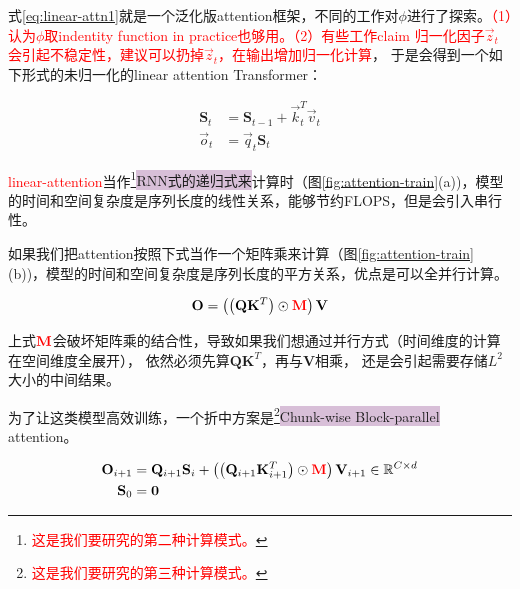 式\eqref{eq:linear-attn1}就是一个泛化版attention框架，不同的工作对$\phi$进行了探索。\textcolor{red}{（1）认为$\phi$取indentity function in practice也够用。（2）有些工作claim 归一化因子$\vec{z}_t$会引起不稳定性，建议可以扔掉$\vec{z}_t$，在输出增加归一化计算}，
于是会得到一个如下形式的未归一化的linear attention Transformer：

\begin{align}
\mathbf{S}_t &= \mathbf{S}_{t-1} + \vec{k}_t^T\vec{v}_t \label{eq:linear-attn2}\\
\vec{o}_t &= \vec{q}_t\mathbf{S}_t \nonumber
\end{align}

\textcolor{red}{linear-attention}当作\footnote{\textcolor{red}{这是我们要研究的第二种计算模式。}}{\colorbox{thistle}{RNN式的递归式来}}计算时（图\ref{fig:attention-train}(a))，模型的时间和空间复杂度是序列长度的线性关系，能够节约FLOPS，但是会引入串行性。

如果我们把attention按照下式当作一个矩阵乘来计算（图\ref{fig:attention-train}(b))，模型的时间和空间复杂度是序列长度的平方关系，优点是可以全并行计算。

$$\mathbf{O} = \left( \left(\mathbf{Q}\mathbf{K}^T\right) \odot \textcolor{red}{\mathbf{M}} \right)\mathbf{V}$$

上式$\textcolor{red}{\textbf{M}}$会破坏矩阵乘的结合性，导致如果我们想通过并行方式（时间维度的计算在空间维度全展开），
依然必须先算$\mathbf{Q}\mathbf{K}^T$，再与$\mathbf{V}$相乘，
还是会引起需要存储$L^2$大小的中间结果。

为了让这类模型高效训练，一个折中方案是\footnote{\textcolor{red}{这是我们要研究的第三种计算模式。}}{\colorbox{thistle}{Chunk-wise Block-parallel}} attention。

\begin{align*}
\mathbf{O}_{i+1} &= \mathbf{Q}_{i+1}\mathbf{S}_{i} + \left( \left(\mathbf{Q}_{i+1}\mathbf{K}_{i+1}^T\right) \odot \textcolor{red}{\mathbf{M}} \right)\mathbf{V}_{i+1} \in \mathbb{R} ^{C\times d} \\
\mathbf{S}_0 &= \mathbf{0}
\end{align*}


